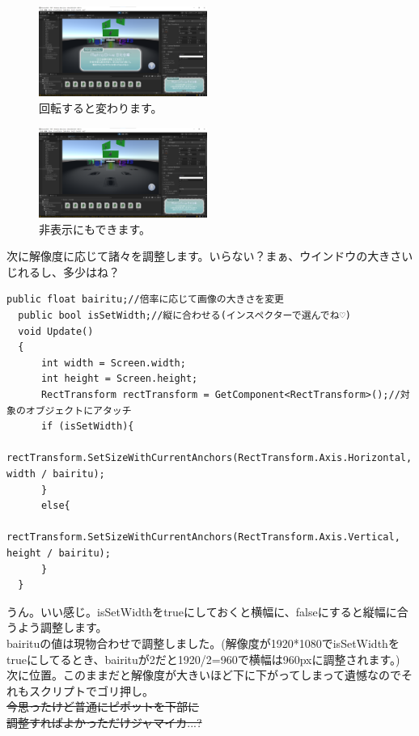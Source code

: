 \documentclass[b5paper,9pt,platex,dvipdfmx]{jsarticle}
\begin{document}
\begin{multicols*}{3}
\begin{figure}[H]
  \centering
  \includegraphics[width=5.5cm]{5.png}
  \caption{回転すると変わります。}
\end{figure}
\begin{figure}[H]
  \centering
  \includegraphics[width=5.5cm]{6.png}
  \caption{非表示にもできます。}
\end{figure}
次に解像度に応じて諸々を調整します。いらない？まぁ、ウインドウの大きさいじれるし、多少はね？\\
\begin{lstlisting}[caption=DisplaySet.cs]
  public float bairitu;//倍率に応じて画像の大きさを変更
  public bool isSetWidth;//縦に合わせる(インスペクターで選んでね♡)
  void Update()
  {
      int width = Screen.width;
      int height = Screen.height;
      RectTransform rectTransform = GetComponent<RectTransform>();//対象のオブジェクトにアタッチ
      if (isSetWidth){
          rectTransform.SetSizeWithCurrentAnchors(RectTransform.Axis.Horizontal, width / bairitu);
      }
      else{
          rectTransform.SetSizeWithCurrentAnchors(RectTransform.Axis.Vertical, height / bairitu);
      }
  }
\end{lstlisting}
うん。いい感じ。isSetWidthをtrueにしておくと横幅に、falseにすると縦幅に合うよう調整します。\\
bairituの値は現物合わせで調整しました。(解像度が1920*1080でisSetWidthをtrueにしてるとき、bairituが2だと1920/2=960で横幅は960pxに調整されます。)\\
次に位置。このままだと解像度が大きいほど下に下がってしまって遺憾なのでそれもスクリプトでゴリ押し。\\
\sout{今思ったけど普通にピポットを下部に}\\
\sout{調整すればよかっただけジャマイカ...?}\\
\begin{lstlisting}[caption=SetInfoTex.cs]

\end{lstlisting}
\end{multicols*}
\end{document}
